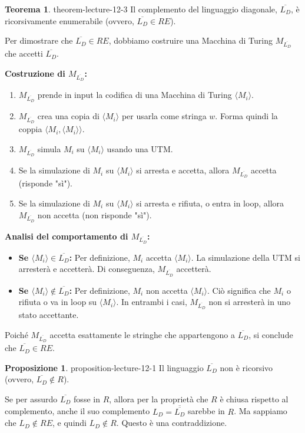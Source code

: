 \documentclass[a4paper]{article}
\makeatletter
\theoremstyle{definition} %
\newtheorem{theorem}{Teorema}
[section] %
\newtheorem{proposition}{Proposizione}[section]
\renewenvironment{proof}[1][\proofname]{\par
  \pushQED{\qed}%
  \normalfont \topsep6\p@\@plus6\p@\relax
  \trivlist
  \item[\hskip\labelsep
        \bfseries
    #1\@addpunct{.}]\ignorespaces
}{%
  \popQED\endtrivlist\@endpefalse
}
\makeatother
\begin{document}
\begin{theorem}{}{{ theorem-lecture-12-3 }}
Il complemento del linguaggio diagonale, $\overline{L_D}$, è ricorsivamente enumerabile (ovvero, $\overline{L_D} \in RE$).
\end{theorem}
\begin{proof}
Per dimostrare che $\overline{L_D} \in RE$, dobbiamo costruire una Macchina di Turing $M_{\overline{L_D}}$ che accetti $\overline{L_D}$.

\textbf{Costruzione di $M_{\overline{L_D}}$:}
\begin{enumerate}
    \item $M_{\overline{L_D}}$ prende in input la codifica di una Macchina di Turing $\langle M_i \rangle$.
    \item $M_{\overline{L_D}}$ crea una copia di $\langle M_i \rangle$ per usarla come stringa $w$. Forma quindi la coppia $\langle M_i, \langle M_i \rangle \rangle$.
    \item $M_{\overline{L_D}}$ simula $M_i$ su $\langle M_i \rangle$ usando una UTM.
    \item Se la simulazione di $M_i$ su $\langle M_i \rangle$ si arresta e accetta, allora $M_{\overline{L_D}}$ accetta (risponde "sì").
    \item Se la simulazione di $M_i$ su $\langle M_i \rangle$ si arresta e rifiuta, o entra in loop, allora $M_{\overline{L_D}}$ non accetta (non risponde "sì").
\end{enumerate}
\textbf{Analisi del comportamento di $M_{\overline{L_D}}$:}
\begin{itemize}
    \item \textbf{Se $\langle M_i \rangle \in \overline{L_D}$:}
    Per definizione, $M_i$ accetta $\langle M_i \rangle$. La simulazione della UTM si arresterà e accetterà. Di conseguenza, $M_{\overline{L_D}}$ accetterà.
    \item \textbf{Se $\langle M_i \rangle \notin \overline{L_D}$:}
    Per definizione, $M_i$ non accetta $\langle M_i \rangle$. Ciò significa che $M_i$ o rifiuta o va in loop su $\langle M_i \rangle$. In entrambi i casi, $M_{\overline{L_D}}$ non si arresterà in uno stato accettante.
\end{itemize}
Poiché $M_{\overline{L_D}}$ accetta esattamente le stringhe che appartengono a $\overline{L_D}$, si conclude che $\overline{L_D} \in RE$.
\end{proof}

\begin{proposition}{}{{ proposition-lecture-12-1 }}
Il linguaggio $\overline{L_D}$ non è ricorsivo (ovvero, $\overline{L_D} \notin R$).
\end{proposition}
\begin{proof}
Se per assurdo $\overline{L_D}$ fosse in $R$, allora per la proprietà che $R$ è chiusa rispetto al complemento, anche il suo complemento $L_D = \overline{\overline{L_D}}$ sarebbe in $R$. Ma sappiamo che $L_D \notin RE$, e quindi $L_D \notin R$. Questo è una contraddizione.
\end{proof}
\end{document}

